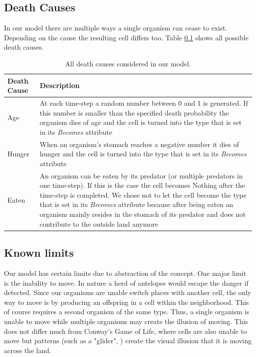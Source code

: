 \documentclass[11pt]{article}
\begin{document}
\subsection{Death Causes}
\label{tab:deathCauses}
In our model there are multiple ways a single organism can cease to exist. Depending on the cause the resulting cell differs too. Table \ref{tab:deathCauses} shows all possible death causes.
\begin{table}[htbp]
\centering
\begin{tabular}{l|p{11cm}}
Death Cause & Description \\ 
\hline 
\hline 
Age & At each time-step a random number between 0 and 1 is generated. If this number is smaller than the specified death probability the organism dies of age and the cell is turned into the type that is set in its {\it Becomes} attribute\\ 
\hline 
Hunger & When an organism's stomach reaches a negative number it dies of hunger and the cell is turned into the type that is set in its {\it Becomes} attribute\\ 
\hline 
Eaten & An organism can be eaten by its predator (or multiple predators in one time-step). If this is the case the cell becomes Nothing after the time-step is completed. We chose not to let the cell become the type that is set in its {\it Becomes} attribute because after being eaten an organism mainly resides in the stomach of its predator and does not contribute to the outside land anymore\\  
\end{tabular}
\caption{All death causes considered in our model.}
\end{table}

\subsection{Known limits}
\label{sec:knownLimits}
Our model has certain limits due to abstraction of the concept. One major limit is the inability to move. In nature a herd of antelopes would escape the danger if detected. Since our organisms are unable switch places with another cell, the only way to move is by producing an offspring in a cell within the neighborhood. This of course requires a second organism of the same type. Thus, a single organism is unable to move while multiple organisms may create the illusion of moving. This does not differ much from Conway's Game of Life, where cells are also unable to move but patterns (such as a "glider", \cite{gameOfLife}) create the visual illusion that it is moving across the land.
\end{document}
